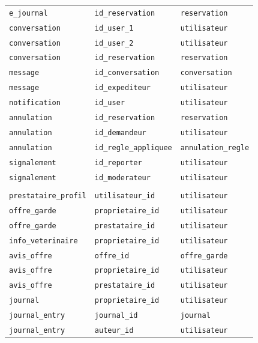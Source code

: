 \documentclass[11pt,a4paper]{article}
\begin{document}
\begin{longtable}{@{}lll@{}}
\texttt{e\_journal} & \texttt{id\_reservation} & \texttt{reservation} \\
\texttt{conversation} & \texttt{id\_user\_1} & \texttt{utilisateur} \\
\texttt{conversation} & \texttt{id\_user\_2} & \texttt{utilisateur} \\
\texttt{conversation} & \texttt{id\_reservation} & \texttt{reservation} \\
\texttt{message} & \texttt{id\_conversation} & \texttt{conversation} \\
\texttt{message} & \texttt{id\_expediteur} & \texttt{utilisateur} \\
\texttt{notification} & \texttt{id\_user} & \texttt{utilisateur} \\
\texttt{annulation} & \texttt{id\_reservation} & \texttt{reservation} \\
\texttt{annulation} & \texttt{id\_demandeur} & \texttt{utilisateur} \\
\texttt{annulation} & \texttt{id\_regle\_appliquee} & \texttt{annulation\_regle} \\
\texttt{signalement} & \texttt{id\_reporter} & \texttt{utilisateur} \\
\texttt{signalement} & \texttt{id\_moderateur} & \texttt{utilisateur} \\
\addlinespace
\multicolumn{3}{@{}l}{\textit{Modele operationnel}}\\
\texttt{prestataire\_profil} & \texttt{utilisateur\_id} & \texttt{utilisateur} \\
\texttt{offre\_garde} & \texttt{proprietaire\_id} & \texttt{utilisateur} \\
\texttt{offre\_garde} & \texttt{prestataire\_id} & \texttt{utilisateur} \\
\texttt{info\_veterinaire} & \texttt{proprietaire\_id} & \texttt{utilisateur} \\
\texttt{avis\_offre} & \texttt{offre\_id} & \texttt{offre\_garde} \\
\texttt{avis\_offre} & \texttt{proprietaire\_id} & \texttt{utilisateur} \\
\texttt{avis\_offre} & \texttt{prestataire\_id} & \texttt{utilisateur} \\
\texttt{journal} & \texttt{proprietaire\_id} & \texttt{utilisateur} \\
\texttt{journal\_entry} & \texttt{journal\_id} & \texttt{journal} \\
\texttt{journal\_entry} & \texttt{auteur\_id} & \texttt{utilisateur} \\

\end{longtable}
\end{document}
